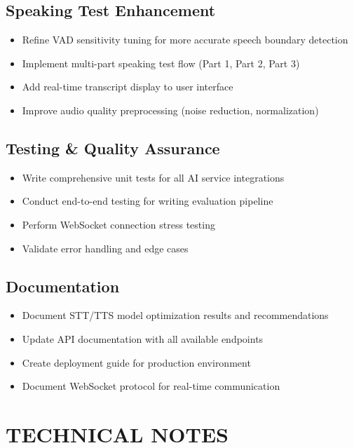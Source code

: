 \documentclass[11pt]{article}
\begin{document}
\subsection{Speaking Test Enhancement}
\begin{itemize}[leftmargin=2em]
    \item Refine VAD sensitivity tuning for more accurate speech boundary detection
    \item Implement multi-part speaking test flow (Part 1, Part 2, Part 3)
    \item Add real-time transcript display to user interface
    \item Improve audio quality preprocessing (noise reduction, normalization)
\end{itemize}

\subsection{Testing \& Quality Assurance}
\begin{itemize}[leftmargin=2em]
    \item Write comprehensive unit tests for all AI service integrations
    \item Conduct end-to-end testing for writing evaluation pipeline
    \item Perform WebSocket connection stress testing
    \item Validate error handling and edge cases
\end{itemize}

\subsection{Documentation}
\begin{itemize}[leftmargin=2em]
    \item Document STT/TTS model optimization results and recommendations
    \item Update API documentation with all available endpoints
    \item Create deployment guide for production environment
    \item Document WebSocket protocol for real-time communication
\end{itemize}

\vspace{1cm}
\section*{TECHNICAL NOTES}
\end{document}
